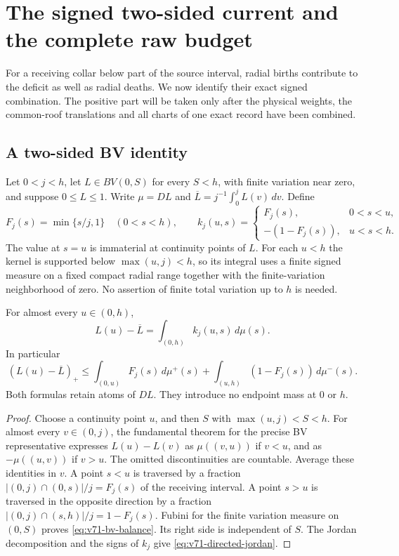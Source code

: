 \section{The signed two-sided current and the complete raw budget}
\label{sec:v71-two-sided-current}
For a receiving collar below part of the source interval, radial
births contribute to the deficit as well as radial deaths. We now
identify their exact signed combination. The positive part will be
taken only after the physical weights, the common-roof translations
and all charts of one exact record have been combined.

\subsection{A two-sided BV identity}
Let $0<j<h$, let $L\in BV(0,S)$ for every $S<h$, with finite
variation near zero, and suppose $0\le L\le1$. Write $\mu=DL$
and $\overline L=j^{-1}\int_0^jL(v)\,dv$. Define
\begin{equation}\label{eq:v71-collar-distribution}
 F_j(s)=\min\{s/j,1\}\quad(0<s<h),\qquad
 k_j(u,s)=
 \begin{cases}
 F_j(s),&0<s<u,\\
 -(1-F_j(s)),&u<s<h.
 \end{cases}
\end{equation}
The value at $s=u$ is immaterial at continuity points of $L$.
For each $u<h$ the kernel is supported below $\max(u,j)<h$,
so its integral uses a finite signed measure on a fixed compact
radial range together with the finite-variation neighborhood of zero.
No assertion of finite total variation up to $h$ is needed.

\begin{lemma}
\label{lem:v71-bv-balance}
For almost every $u\in(0,h)$,
\begin{equation}\label{eq:v71-bv-balance}
 L(u)-\overline L=\int_{(0,h)}k_j(u,s)\,d\mu(s).
\end{equation}
In particular
\begin{equation}\label{eq:v71-directed-jordan}
 (L(u)-\overline L)_+
 \le \int_{(0,u)}F_j(s)\,d\mu^+(s)
       +\int_{(u,h)}(1-F_j(s))\,d\mu^-(s).
\end{equation}
Both formulas retain atoms of $DL$. They introduce no endpoint
mass at $0$ or $h$.
\end{lemma}
\begin{proof}
Choose a continuity point $u$, and then $S$ with
$\max(u,j)<S<h$. For almost every $v\in(0,j)$, the fundamental
theorem for the precise BV representative expresses $L(u)-L(v)$
as $\mu((v,u))$ if $v<u$, and as $-\mu((u,v))$ if $v>u$.
The omitted discontinuities are countable. Average these identities
in $v$. A point $s<u$ is traversed by a fraction
$|(0,j)\cap(0,s)|/j=F_j(s)$ of the receiving interval. A point
$s>u$ is traversed in the opposite direction by a fraction
$|(0,j)\cap(s,h)|/j=1-F_j(s)$. Fubini for the finite variation
measure on $(0,S)$ proves \eqref{eq:v71-bv-balance}. Its right
side is independent of $S$. The Jordan decomposition and the signs
of $k_j$ give \eqref{eq:v71-directed-jordan}.
\end{proof}

